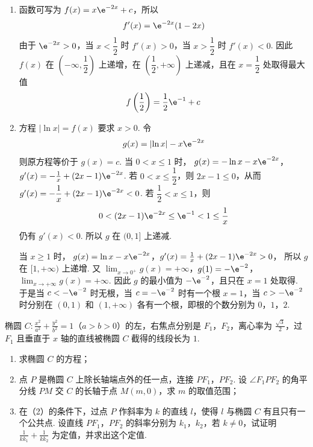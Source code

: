 \begin{solution}
\begin{enumerate}
\item
函数可写为 \(f(x)=x\e^{-2x}+c\)，所以
\[
f'(x)=\e^{-2x}(1-2x)
\]
由于 \(\e^{-2x}>0\)，当 \(x<\dfrac12\) 时 \(f'(x)>0\)，当 \(x>\dfrac12\) 时 \(f'(x)<0\). 因此 \(f(x)\) 在 \(\left(-\infty,\dfrac12\right)\) 上递增，在 \(\left(\dfrac12,+\infty\right)\) 上递减，且在 \(x=\dfrac12\) 处取得最大值
\[
f\left(\frac12\right)=\frac12\e^{-1}+c
\]

\item
方程 \(\lvert\ln x\rvert=f(x)\) 要求 \(x>0\). 令
\[
g(x)=\lvert\ln x\rvert-x\e^{-2x}
\]
则原方程等价于 \(g(x)=c\). 当 \(0<x\leq1\) 时，
\(g(x)=-\ln x-x\e^{-2x}\)，\(g'(x)=-\frac1x+(2x-1)\e^{-2x}\).
若 \(0<x\leq\dfrac12\)，则 \(2x-1\leqslant0\)，从而 \(g'(x)=-\dfrac1x+(2x-1)\e^{-2x}<0\). 若 \(\dfrac12<x\leq1\)，则
\[
0<(2x-1)\e^{-2x}\leq \e^{-1}<1\leq\frac1x
\]
仍有 \(g'(x)<0\). 所以 \(g\) 在 \((0,1]\) 上递减.

当 \(x\geq1\) 时，
\(g(x)=\ln x-x\e^{-2x}\)，\(g'(x)=\frac1x+(2x-1)\e^{-2x}>0\)，
所以 \(g\) 在 \([1,+\infty)\) 上递增. 又
\(\lim_{x\to0^+}g(x)=+\infty\)，\(g(1)=-\e^{-2}\)，\(\lim_{x\to+\infty}g(x)=+\infty\).
因此 \(g\) 的最小值为 \(-\e^{-2}\)，且只在 \(x=1\) 处取得. 于是当 \(c<-\e^{-2}\) 时无根，当 \(c=-\e^{-2}\) 时有一个根 \(x=1\)，当 \(c>-\e^{-2}\) 时分别在 \((0,1)\) 和 \((1,+\infty)\) 各有一个根，即根的个数分别为 \(0\)，\(1\)，\(2\).
\end{enumerate}
\end{solution}

\begin{problem}
椭圆 \(C: \frac{x^2}{a^2} + \frac{y^2}{b^2} = 1\)（\(a > b > 0\)）的左，右焦点分别是 \(F_{1}\)，\(F_{2}\)，离心率为 \(\frac{\sqrt{3}}{2}\)，过 \(F_{1}\) 且垂直于 \(x\) 轴的直线被椭圆 \(C\) 截得的线段长为 \(1\).
\begin{enumerate}
\item 求椭圆 \(C\) 的方程；
\item 点 \(P\) 是椭圆 \(C\) 上除长轴端点外的任一点，连接 \(PF_{1}\)，\(PF_{2}\). 设 \(\angle F_{1}PF_{2}\) 的角平分线 \(PM\) 交 \(C\) 的长轴于点 \(M(m,0)\)，求 \(m\) 的取值范围；
\item 在（2）的条件下，过点 \(P\) 作斜率为 \(k\) 的直线 \(l\)，使得 \(l\) 与椭圆 \(C\) 有且只有一个公共点. 设直线 \(PF_{1}\)，\(PF_{2}\) 的斜率分别为 \(k_{1}\)，\(k_{2}\)，若 \(k \neq 0\)，试证明 \(\frac{1}{kk_{1}} + \frac{1}{kk_{2}}\) 为定值，并求出这个定值.
\end{enumerate}
\end{problem}

